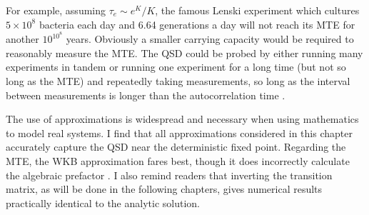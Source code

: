 For example, assuming $\tau_e \sim e^K/K$, the famous Lenski experiment \cite{Lenski1991} which cultures $5\times 10^8$ bacteria each day and 6.64 generations a day will not reach its MTE for another $10^{10^8}$ years. Obviously a smaller carrying capacity would be required to reasonably measure the MTE. 
The QSD could be probed by either running many experiments in tandem or running one experiment for a long time (but not so long as the MTE) and repeatedly taking measurements, so long as the interval between measurements is longer than the autocorrelation time \cite{Hanggi1990}. %

The use of approximations is widespread and necessary when using mathematics to model real systems. 
I find that all approximations considered in this chapter accurately capture the QSD near the deterministic fixed point. %
Regarding the MTE, the WKB approximation fares best, though it does incorrectly calculate the algebraic prefactor \cite{Assaf2010,Badali2019a,Badali2019b}. %
I also remind readers that inverting the transition matrix, as will be done in the following chapters, gives numerical results practically identical to the analytic solution. 

